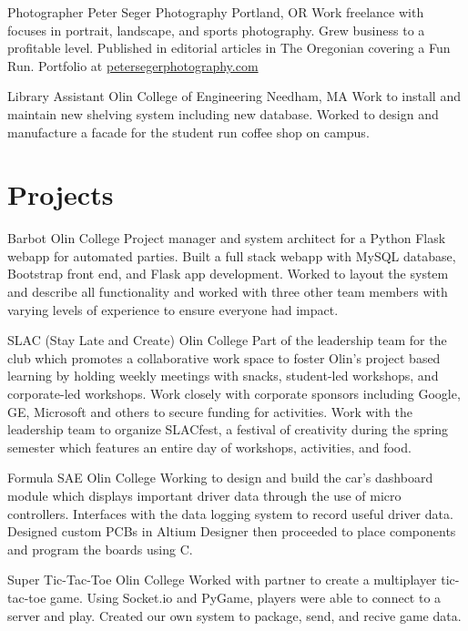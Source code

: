 \documentclass[11 pt]{moderncv}
\begin{document}
{Photographer}
{Peter Seger Photography}
{Portland, OR}
{}
{Work freelance with focuses in portrait, landscape, and sports photography. Grew business to a profitable level.
 Published in editorial articles in The Oregonian covering a Fun Run. Portfolio at \href{www.petersegerphotography.com}{petersegerphotography.com}}

{Library Assistant}
{Olin College of Engineering}
{Needham, MA}
{}
{Work to install and maintain new shelving system including new database. Worked to design and manufacture a facade for the student run coffee shop on campus.}

\vspace{0.03 in}
\section{Projects}

{Barbot}
{Olin College}
{}
{}
{Project manager and system architect for a Python Flask webapp for automated parties. Built a full stack webapp with MySQL database, Bootstrap front end, and Flask app development. Worked to layout the system and describe all functionality and worked with three other team members with varying levels of experience to ensure everyone had impact. }

{SLAC (Stay Late and Create)}
{Olin College}
{}
{}
{Part of the leadership team for the club which promotes a collaborative work space to foster Olin's project based learning by holding weekly meetings with snacks, student-led workshops, and corporate-led workshops. Work closely with corporate sponsors including Google, GE, Microsoft and others to secure funding for activities. Work with the leadership team to organize SLACfest, a festival of creativity during the spring semester which features an entire day of workshops, activities, and food.}

{Formula SAE}
{Olin College}
{}
{}
{Working to design and build the car's dashboard module which displays important driver data through the use of micro controllers. Interfaces with the data logging system to record useful driver data. Designed custom PCBs in Altium Designer then proceeded to place components and program the boards using C.}

{Super Tic-Tac-Toe}
{Olin College}
{}
{}
{Worked with partner to create a multiplayer tic-tac-toe game. Using Socket.io and PyGame, players were able to connect to a server and play. Created our own system to package, send, and recive game data.}
\end{document}
